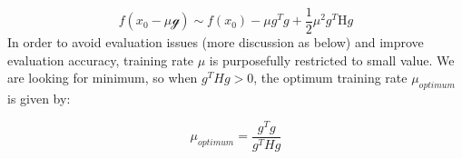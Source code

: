 \begin{equation}
\label{eq:TaylorEvaStep}
    f(x_0-\mu\mathcal{g}) \sim f(x_0) - \mu g^Tg + \frac{1}{2}\mu^2g^T\mathrm{H}g
\end{equation}
In order to avoid evaluation issues (more discussion as below) and improve evaluation accuracy, training rate $\mu$ is purposefully restricted to small value. We are looking for minimum, so when $g^THg > 0$, the optimum training rate $\mu_{optimum}$ is given by:

\begin{equation}
    \mu_{optimum} = \frac{g^Tg}{g^THg}
\end{equation}
